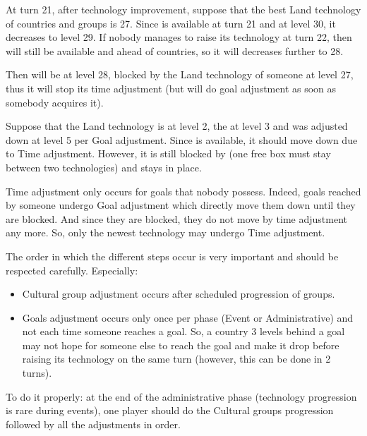 \begin{exemple}
  At turn 21, after technology improvement, suppose that the best Land
  technology of countries and groups is 27. Since \TMUS is available at turn
  21 and at level 30, it decreases to level 29. If nobody manages to raise its
  technology at turn 22, then \TMUS will still be available and ahead of
  countries, so it will decreases further to 28.

  Then \TMUS will be at level 28, blocked by the Land technology of someone at
  level 27, thus it will stop its time adjustment (but will do goal adjustment
  as soon as somebody acquires it).
\end{exemple}

\begin{exemple}
  Suppose that the \ROTW Land technology is at level 2, the \TREN at level 3
  and \TARQ was adjusted down at level 5 per Goal adjustment. Since \TARQ is
  available, it should move down due to Time adjustment. However, it is still
  blocked by \TREN (one free box must stay between two technologies) and stays
  in place.
\end{exemple}

\begin{playtip}
  Time adjustment only occurs for goals that nobody possess. Indeed, goals
  reached by someone undergo Goal adjustment which directly move them down
  until they are blocked. And since they are blocked, they do not move by time
  adjustment any more. So, only the newest technology may undergo Time
  adjustment.
\end{playtip}

\begin{designnote}
  The order in which the different steps occur is very important and should be
  respected carefully. Especially:
  \begin{itemize}
  \item Cultural group adjustment occurs after scheduled progression of
    groups.
  \item Goals adjustment occurs only once per phase (Event or Administrative)
    and not each time someone reaches a goal. So, a country 3 levels behind a
    goal may not hope for someone else to reach the goal and make it drop
    before raising its technology on the same turn (however, this can be done
    in 2 turns).
  \end{itemize}

  To do it properly: at the end of the administrative phase (technology
  progression is rare during events), one player should do the Cultural groups
  progression followed by all the adjustments in order.
\end{designnote}



